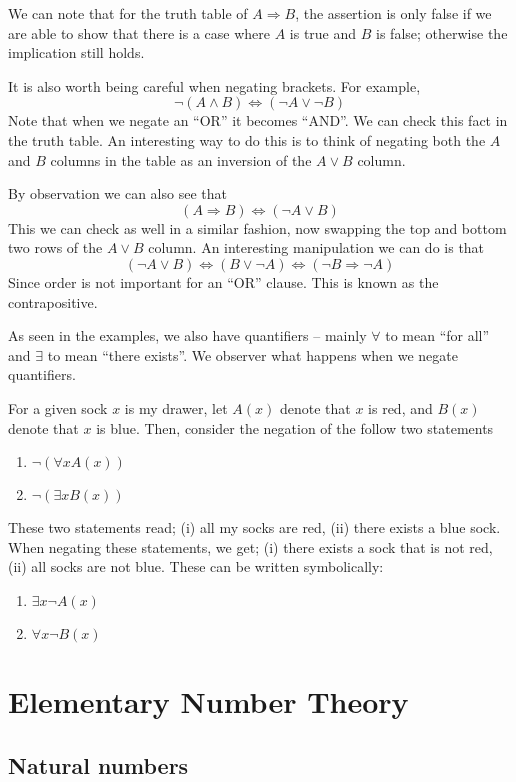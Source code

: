 \documentclass{article}
\begin{document}
We can note that for the truth table of $A \Rightarrow B$, the assertion is only false if we are able to show that there is a case where $A$ is true and $B$ is false; otherwise the implication still holds. 

It is also worth being careful when negating brackets. For example,
\[
    \neg (A \wedge B) \Leftrightarrow (\neg A \vee \neg B)
\]
Note that when we negate an ``OR'' it becomes ``AND''. We can check this fact in the truth table. An interesting way to do this is to think of negating both the $A$ and $B$ columns in the table as an inversion of the $A \vee B$ column.

By observation we can also see that
\[
    (A \Rightarrow B) \Leftrightarrow (\neg A \vee B)
\]
This we can check as well in a similar fashion, now swapping the top and bottom two rows of the $A \vee B$ column. An interesting manipulation we can do is that
\[
    (\neg A \vee B) \Leftrightarrow (B \vee \neg A) \Leftrightarrow (\neg B \Rightarrow \neg A)
\]
Since order is not important for an ``OR'' clause. This is known as the contrapositive.

As seen in the examples, we also have quantifiers -- mainly $\forall$ to mean ``for all'' and $\exists$ to mean ``there exists''. We observer what happens when we negate quantifiers.

For a given sock $x$ is my drawer, let $A(x)$ denote that $x$ is red, and $B(x)$ denote that $x$ is blue. Then, consider the negation of the follow two statements
\begin{enumerate}
    \item $\neg (\forall x A(x))$
    \item $\neg (\exists x B(x))$
\end{enumerate}

These two statements read; (i) all my socks are red, (ii) there exists a blue sock. When negating these statements, we get; (i) there exists a sock that is not red, (ii) all socks are not blue. These can be written symbolically:
\begin{enumerate}
    \item $\exists x \neg A(x)$
    \item $\forall x \neg B(x)$
\end{enumerate}

\section{Elementary Number Theory}
\subsection{Natural numbers}
\end{document}
